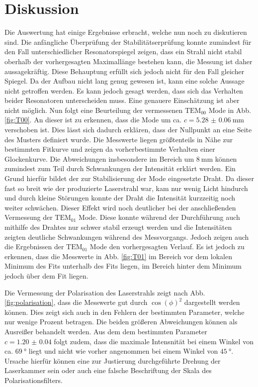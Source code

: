 
\section{Diskussion}
\label{sec:Diskussion}
Die Auswertung hat einige Ergebnisse erbracht, welche nun noch zu diskutieren sind. Die anfängliche Überprüfung der Stabilitätserprüfung konnte zumindest für den Fall unterschiedlicher Resonatorspiegel zeigen, dass ein Strahl nicht stabil oberhalb der vorhergesagten Maximallänge bestehen kann, die Messung ist daher aussagekräftig. Diese Behauptung erfüllt sich jedoch nicht für den Fall gleicher Spiegel. Da der Aufbau nicht lang genug gewesen ist, kann eine solche Aussage nicht getroffen werden. Es kann jedoch gesagt werden, dass sich das Verhalten beider Resonatoren unterscheiden muss. Eine genauere Einschätzung ist aber nicht möglich. Nun folgt eine Beurteilung der vermessenen $\text{TEM}_\text{00}$ Mode in Abb. \ref{fig:T00}. An dieser ist zu erkennen, dass die Mode um ca. $c = \SI{5.28(6)}{\milli\meter}$ verschoben ist. Dies lässt sich dadurch erklären, dass der Nullpunkt an eine Seite des Musters definiert wurde. Die Messwerte liegen größtenteils in Nähe zur bestimmten Fitkurve und zeigen da vorherbestimmte Verhalten einer Glockenkurve. Die Abweichungen insbesondere im Bereich um $\SI{8}{\milli\meter}$ können zumindest zum Teil durch Schwankungen der Intensität erklärt werden. Ein Grund hierfür bildet der zur Stabilisierung der Mode eingesetzte Draht. Da dieser fast so breit wie der produzierte Laserstrahl war, kam nur wenig Licht hindurch und durch kleine Störungen konnte der Draht die Intensität kurzzeitig noch weiter schwächen. Dieser Effekt wird noch deutlicher bei der anschließenden Vermessung der $\text{TEM}_{01}$ Mode. Diese konnte während der Durchführung auch mithilfe des Drahtes nur schwer stabil erzeugt werden und die Intensitäten zeigten deutliche Schwankungen während des Messvorgangs. Jedoch zeigen auch die Ergebnissen der $\text{TEM}_{01}$ Mode den vorhergesagten Verlauf. Es ist jedoch zu erkennen, dass die Messwerte in Abb. \ref{fig:T01} im Bereich vor dem lokalen Minimum des Fits unterhalb des Fits liegen, im Bereich hinter dem Minimum jedoch über dem Fit liegen. 


Die Vermessung der Polarisation des Laserstrahls zeigt nach Abb. \ref{fig:polarisation}, dass die Messwerte gut durch $\cos(\phi)^2$ dargestellt werden können. Dies zeigt sich auch in den Fehlern der bestimmten Parameter, welche nur wenige Prozent betragen. Die beiden größeren Abweichungen können als Ausreißer behandelt werden. Aus dem dem bestimmten Parameter $c = \num{1.20(4)}$ folgt zudem, dass die maximale Intensnität bei einem Winkel von ca. $\SI{69}{\degree}$ liegt und nicht wie vorher angenommen bei einem Winkel von $\SI{45}{\degree}$. Ursache hierfür können eine zur Justierung durchgeführte Drehung der Laserkammer sein oder auch eine falsche Beschriftung der Skala des Polarisationsfilters.
